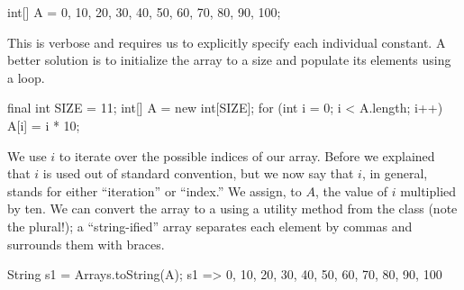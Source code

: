 \begin{verbnobox}[\small]
int[] A = {0, 10, 20, 30, 40, 50, 60, 70, 80, 90, 100};
\end{verbnobox}
This is verbose and requires us to explicitly specify each individual constant. A better solution is to initialize the array to a size and populate its elements using a loop.
\begin{verbnobox}[\small]
final int SIZE = 11;
int[] A = new int[SIZE];
for (int i = 0; i < A.length; i++) { A[i] = i * 10; }
\end{verbnobox}
We use $i$ to iterate over the possible indices of our array. Before we explained that $i$ is used out of standard convention, but we now say that $i$, in general, stands for either ``iteration'' or ``index.'' We assign, to $A$, the value of $i$ multiplied by ten. We can convert the array to a  using a utility method from the  class (note the plural!); a ``string-ified'' array separates each element by commas and surrounds them with braces.
\begin{verbnobox}[\small]
String s1 = Arrays.toString(A);
s1 => {0, 10, 20, 30, 40, 50, 60, 70, 80, 90, 100}
\end{verbnobox}

